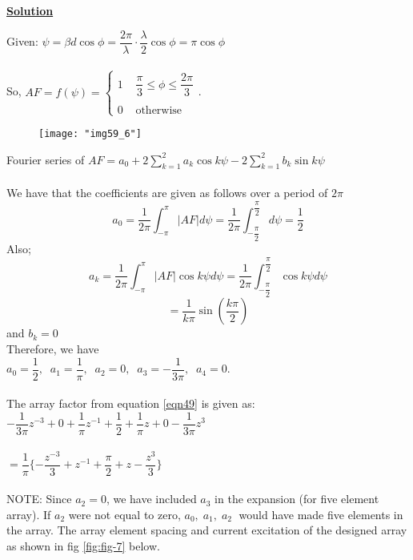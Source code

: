 	\begin{center}
		\textbf{\underline{Solution}}
	\end{center}
	Given: $\psi = \beta d \cos\phi = \dfrac{2\pi}{\lambda} \cdot \dfrac{\lambda}{2} \cos\phi = \pi\cos\phi$\\
	\\
	So, $AF = f(\psi) =\begin{cases}
	1 \; \; \; \; \dfrac{\pi}{3} \leq \phi \leq \dfrac{2\pi}{3}\\
	\\
	0 \; \; \; \; \text{otherwise}
	\end{cases}$. 
	\begin{figure}[H]
		\centering
		\texttt{[image: "img59\_6"]}
		\label{fig:fig-6}
	\end{figure}
	Fourier series of $AF =
	a_0 + 2 \sum_{k = 1}^{2}a_k\cos k\psi - 2 \sum_{k = 1}^{2}b_k\sin k\psi
	\label{sum}
	$\\
	\\
	We have that the coefficients are given as follows over a period of $2\pi$\\
	$$a_0 = \dfrac{1}{2\pi}\int_{-\pi}^{\pi}|AF|d\psi = \dfrac{1}{2\pi}\int_{-\dfrac{\pi}{2}}^{\dfrac{\pi}{2}}d\psi = \frac{1}{2}$$
	Also;
	$$a_k = \dfrac{1}{2\pi}\int_{-\pi}^{\pi}|AF|\cos k\psi d\psi = \dfrac{1}{2\pi}\int_{-\dfrac{\pi}{2}}^{\dfrac{\pi}{2}}\cos k\psi d\psi$$
	$$= \dfrac{1}{k\pi}\sin(\dfrac{k\pi}{2})$$ and $b_k = 0$\\
	Therefore, we have\\
	$ a_0 = \dfrac{1}{2}, \; \; a_1 = \dfrac{1}{\pi},\; \; a_2 = 0, \; \; a_3 = -\dfrac{1}{3\pi}, \; \;a_4 = 0$.\\
	\\
	The array factor from equation \ref{eqn49} is given as:\\
	$-\dfrac{1}{3\pi}z^{-3} + 0 +\dfrac{1}{\pi}z^{-1} + \dfrac{1}{2} + \dfrac{1}{\pi}z + 0 - \dfrac{1}{3\pi}z^{3}$\\
	\\
	$= \dfrac{1}{\pi}\{
	-\dfrac{z^{-3}}{3} + z^{-1} + \dfrac{\pi}{2} + z - \dfrac{z^3}{3}
	\}$\\
	\\
	NOTE: Since $a_2 = 0$, we have included $a_3$ in the expansion (for five element array). If $a_2$ were not equal to zero, $a_0, \; a_1, \; a_2 \;$ would have made five elements in the array. The array element spacing and current excitation of the designed array as shown in fig \ref{fig:fig-7} below.\\
